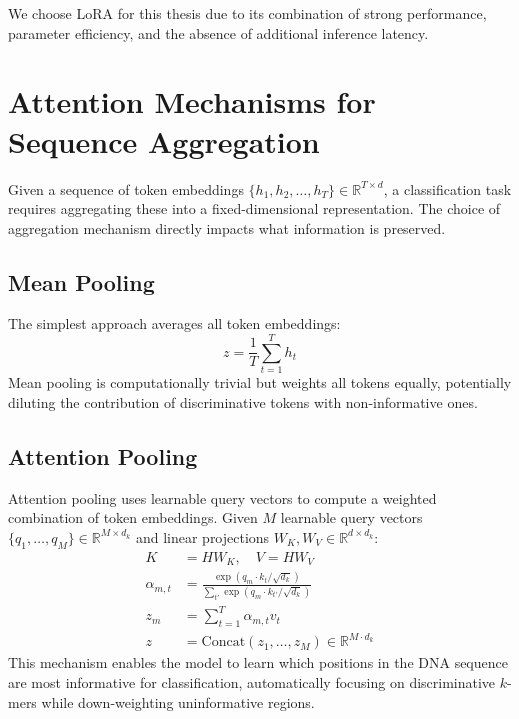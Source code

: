 We choose LoRA for this thesis due to its combination of strong performance, parameter efficiency, and the absence of additional inference latency.

\section{Attention Mechanisms for Sequence Aggregation}
\label{sec:bg-attention}

Given a sequence of token embeddings $\{h_1, h_2, \ldots, h_T\} \in \mathbb{R}^{T \times d}$, a classification task requires aggregating these into a fixed-dimensional representation. The choice of aggregation mechanism directly impacts what information is preserved.

\subsection{Mean Pooling}

The simplest approach averages all token embeddings:
\begin{equation}
    z = \frac{1}{T} \sum_{t=1}^{T} h_t
\end{equation}
Mean pooling is computationally trivial but weights all tokens equally, potentially diluting the contribution of discriminative tokens with non-informative ones.

\subsection{Attention Pooling}

Attention pooling uses learnable query vectors to compute a weighted combination of token embeddings. Given $M$ learnable query vectors $\{q_1, \ldots, q_M\} \in \mathbb{R}^{M \times d_k}$ and linear projections $W_K, W_V \in \mathbb{R}^{d \times d_k}$:
\begin{align}
    K &= H W_K, \quad V = H W_V \\
    \alpha_{m,t} &= \frac{\exp(q_m \cdot k_t / \sqrt{d_k})}{\sum_{t'} \exp(q_m \cdot k_{t'} / \sqrt{d_k})} \\
    z_m &= \sum_{t=1}^{T} \alpha_{m,t} v_t \\
    z &= \text{Concat}(z_1, \ldots, z_M) \in \mathbb{R}^{M \cdot d_k}
\end{align}
This mechanism enables the model to learn which positions in the DNA sequence are most informative for classification, automatically focusing on discriminative $k$-mers while down-weighting uninformative regions.

